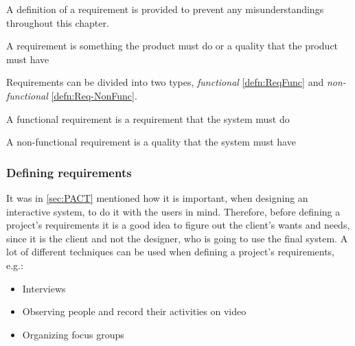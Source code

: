 A definition of a requirement is provided to prevent any misunderstandings throughout this chapter.

\begin{defn}\label{defn:Req}
    A requirement is something the product must do or a quality that the product must have
\end{defn}

Requirements can be divided into two types, \textit{functional} \cref{defn:ReqFunc} and \textit{non-functional} \cref{defn:Req-NonFunc}.

\begin{defn}\label{defn:ReqFunc}
    A functional requirement is a requirement that the system must do
\end{defn}

\begin{defn}\label{defn:Req-NonFunc}
    A non-functional requirement is a quality that the system must have
\end{defn}

\subsubsection{Defining requirements} \label{sec:requirementsdefinition}
It was in \cref{sec:PACT} mentioned how it is important, when designing an interactive system, to do it with the users in mind.
Therefore, before defining a project's requirements it is a good idea to figure out the client's wants and needs, since it is the client and not the designer, who is going to use the final system.
A lot of different techniques can be used when defining a project's requirements, e.g.:

\begin{itemize}
    \item Interviews
    \item Observing people and record their activities on video
    \item Organizing focus groups
\end{itemize}

